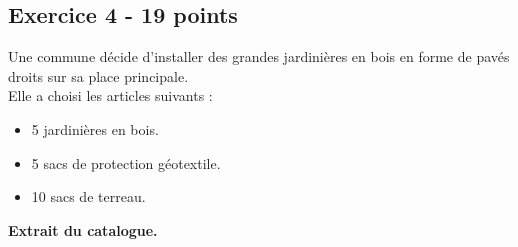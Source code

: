 \newpage
\subsection*{Exercice 4 - 19 points }

Une commune décide d’installer des grandes jardinières en bois en forme de pavés droits sur sa place principale. \\

Elle a choisi les articles suivants :

\begin{itemize}[label={$\bullet$}]
  \item 5 jardinières en bois.
  \item 5 sacs de protection géotextile.
  \item 10 sacs de terreau.
\end{itemize}

\begin{center}\textbf{Extrait du catalogue.}\end{center}

